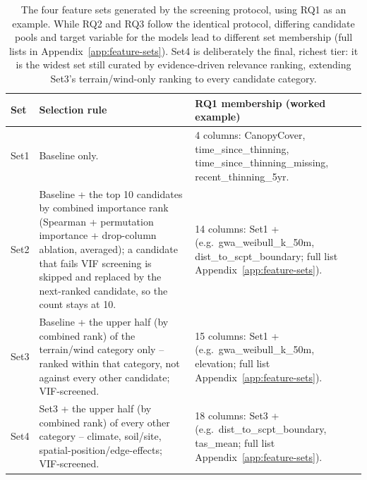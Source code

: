 \documentclass[11pt,a4paper]{report}
\begin{document}
\begin{table}[!htbp]
\centering
\scriptsize
\renewcommand{\arraystretch}{1.2}
\begin{tabular}{p{1cm}p{5.3cm}p{7.2cm}}
\toprule
Set & Selection rule & RQ1 membership (worked example) \\
\midrule
Set1 & Baseline only. & 4 columns: CanopyCover, time\_since\_thinning,
time\_since\_thinning\_missing, recent\_thinning\_5yr. \\
Set2 & Baseline + the top 10 candidates by combined importance rank (Spearman + permutation
importance + drop-column ablation, averaged); a candidate that fails VIF screening is skipped and
replaced by the next-ranked candidate, so the count stays at 10. & 14 columns: Set1 + (e.g.\
gwa\_weibull\_k\_50m, dist\_to\_scpt\_boundary; full list Appendix~\ref{app:feature-sets}). \\
Set3 & Baseline + the upper half (by combined rank) of the terrain/wind category only -- ranked
within that category, not against every other candidate; VIF-screened. & 15 columns: Set1 + (e.g.\
gwa\_weibull\_k\_50m, elevation; full list Appendix~\ref{app:feature-sets}). \\
Set4 & Set3 + the upper half (by combined rank) of every other category -- climate, soil/site,
spatial-position/edge-effects; VIF-screened. & 18 columns: Set3 + (e.g.\ dist\_to\_scpt\_boundary,
tas\_mean; full list Appendix~\ref{app:feature-sets}). \\
\bottomrule
\end{tabular}
\caption{The four feature sets generated by the screening protocol, using RQ1 as an example. While RQ2 and RQ3 follow the identical protocol, differing candidate pools and target variable for the models lead to different set membership (full lists in Appendix~\ref{app:feature-sets}). Set4 is deliberately the final, richest tier: it is the widest set still curated by evidence-driven relevance ranking, extending Set3's terrain/wind-only ranking to every candidate category.}
\label{tab:feature-sets-composition-rq1}
\end{table}
\end{document}
